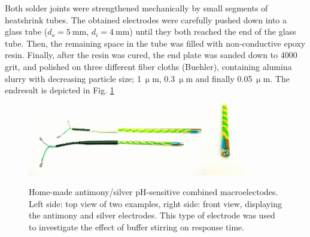 Both solder joints were strengthened mechanically by small segments of heatshrink tubes.
The obtained electrodes were carefully pushed down into a glass tube ($d_o = 5~$mm, $d_i=4~$mm) until they both reached the end of the glass tube.
Then, the remaining space in the tube was filled with non-conductive epoxy resin.
Finally, after the resin was cured, the end plate was sanded down to 4000 grit, and polished on three different fiber cloths (Buehler), containing alumina slurry with decreasing particle size; 1$~\upmu$m, 0.3$~\upmu$m and finally 0.05$~\upmu$m. The endresult is depicted in Fig. \ref{fig:sb_macro}

\begin{figure}
\centering
\includegraphics[width=0.693\textwidth]{img/sb_ag_top.jpg}\includegraphics[width=0.165\textwidth]{img/sb_ag_front.jpg}
\caption[Home-made antimony/silver pH-sensitive combined macroelectrodes.]{Home-made antimony/silver pH-sensitive combined macroelectodes.
Left side: top view of two examples, right side: front view, displaying the antimony and silver electrodes. This type of electrode was used to investigate the effect of buffer stirring on response time.}
\label{fig:sb_macro}
\end{figure}

